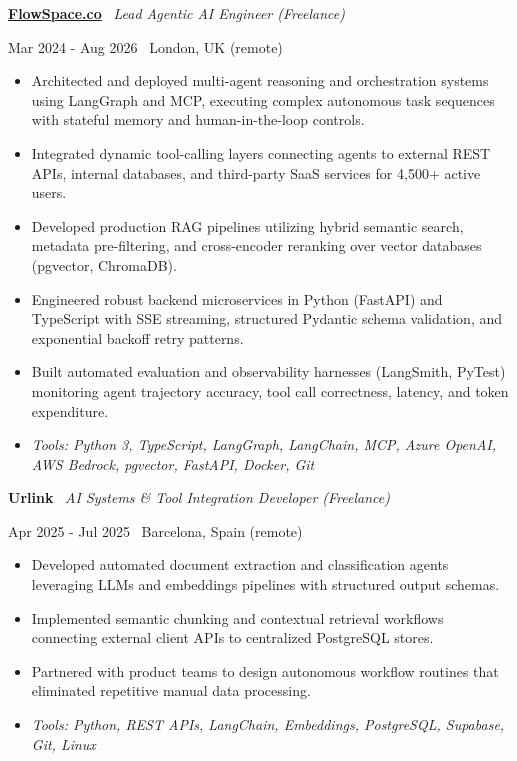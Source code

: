 \documentclass[a4paper,10pt]{article}
\newcommand{\role}[4]{%
  \vspace{2pt}\noindent
  \begin{minipage}[t]{0.70\textwidth}\raggedright\textbf{#1} \textbullet\ \textit{#3}\end{minipage}%
  \hfill
  \begin{minipage}[t]{0.28\textwidth}\raggedleft\footnotesize\color{gray}#2 \textbullet\ #4\end{minipage}%
  \vspace{1pt}%
}
\begin{document}
\role{\href{https://flowspace.co}{FlowSpace.co}}{Mar 2024 - Aug 2026}{Lead Agentic AI Engineer (Freelance)}{London, UK (remote)}
\begin{itemize}
  \item Architected and deployed multi-agent reasoning and orchestration systems using LangGraph and MCP, executing complex autonomous task sequences with stateful memory and human-in-the-loop controls.
  \item Integrated dynamic tool-calling layers connecting agents to external REST APIs, internal databases, and third-party SaaS services for 4,500+ active users.
  \item Developed production RAG pipelines utilizing hybrid semantic search, metadata pre-filtering, and cross-encoder reranking over vector databases (pgvector, ChromaDB).
  \item Engineered robust backend microservices in Python (FastAPI) and TypeScript with SSE streaming, structured Pydantic schema validation, and exponential backoff retry patterns.
  \item Built automated evaluation and observability harnesses (LangSmith, PyTest) monitoring agent trajectory accuracy, tool call correctness, latency, and token expenditure.
  \item \textit{Tools: Python 3, TypeScript, LangGraph, LangChain, MCP, Azure OpenAI, AWS Bedrock, pgvector, FastAPI, Docker, Git}
\end{itemize}

\role{Urlink}{Apr 2025 - Jul 2025}{AI Systems \& Tool Integration Developer (Freelance)}{Barcelona, Spain (remote)}
\begin{itemize}
  \item Developed automated document extraction and classification agents leveraging LLMs and embeddings pipelines with structured output schemas.
  \item Implemented semantic chunking and contextual retrieval workflows connecting external client APIs to centralized PostgreSQL stores.
  \item Partnered with product teams to design autonomous workflow routines that eliminated repetitive manual data processing.
  \item \textit{Tools: Python, REST APIs, LangChain, Embeddings, PostgreSQL, Supabase, Git, Linux}
\end{itemize}
\end{document}

